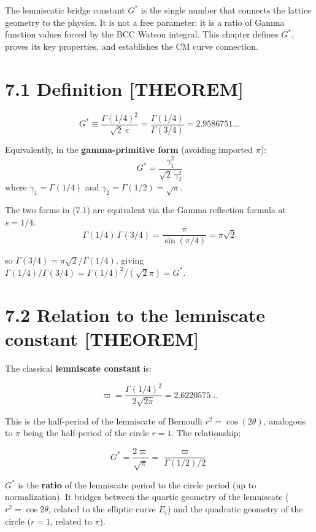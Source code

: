 \documentclass[
  11pt,
  letterpaper,
  twoside,
  openright]{book}
\begin{document}
The lemniscatic bridge constant \(G^*\) is the single number that
connects the lattice geometry to the physics. It is not a free
parameter: it is a ratio of Gamma function values forced by the BCC
Watson integral. This chapter defines \(G^*\), proves its key
properties, and establishes the CM curve connection.

\section{7.1 Definition {[}THEOREM{]}}\label{definition-theorem}

\begin{ftddefinition}

\[
G^* \equiv \frac{\Gamma(1/4)^2}{\sqrt{2}\,\pi} = \frac{\Gamma(1/4)}{\Gamma(3/4)} = 2.9586751\ldots
\tag{7.1}
\]

Equivalently, in the \textbf{gamma-primitive form} (avoiding imported
\(\pi\)): \[
G^* = \frac{\gamma_1^2}{\sqrt{2}\,\gamma_2^2}
\] where \(\gamma_1 = \Gamma(1/4)\) and
\(\gamma_2 = \Gamma(1/2) = \sqrt{\pi}\).

\end{ftddefinition}

The two forms in (7.1) are equivalent via the Gamma reflection formula
at \(s = 1/4\): \[
\Gamma(1/4)\,\Gamma(3/4) = \frac{\pi}{\sin(\pi/4)} = \pi\sqrt{2}
\]

so \(\Gamma(3/4) = \pi\sqrt{2}/\Gamma(1/4)\), giving
\(\Gamma(1/4)/\Gamma(3/4) = \Gamma(1/4)^2/(\sqrt{2}\pi) = G^*\).

\section{7.2 Relation to the lemniscate constant
{[}THEOREM{]}}\label{relation-to-the-lemniscate-constant-theorem}

The classical \textbf{lemniscate constant} is:

\[
\varpi = \frac{\Gamma(1/4)^2}{2\sqrt{2\pi}} = 2.6220575\ldots
\tag{7.2}
\]

This is the half-period of the lemniscate of Bernoulli
\(r^2 = \cos(2\theta)\), analogous to \(\pi\) being the half-period of
the circle \(r = 1\). The relationship:

\[
G^* = \frac{2\varpi}{\sqrt{\pi}} = \frac{\varpi}{\Gamma(1/2)/2}
\tag{7.3}
\]

\(G^*\) is the \textbf{ratio} of the lemniscate period to the circle
period (up to normalization). It bridges between the quartic geometry of
the lemniscate (\(r^2 = \cos 2\theta\), related to the elliptic curve
\(E_i\)) and the quadratic geometry of the circle (\(r = 1\), related to
\(\pi\)).
\end{document}
